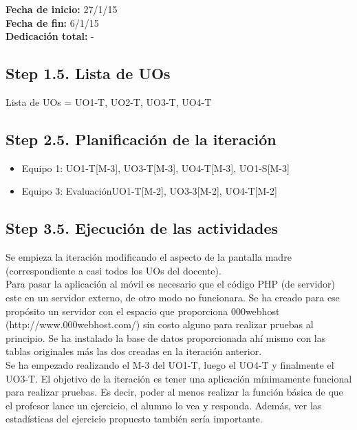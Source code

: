 \begin{flushleft}
\textbf{Fecha de inicio:} 27/1/15\\
\textbf{Fecha de fin:} 6/1/15\\
\textbf{Dedicación total:} -\\
\end{flushleft}

\subsection{Step 1.5. Lista de UOs}
\label{it5:1.5}

Lista de UOs = {UO1-T, UO2-T, UO3-T, UO4-T}

\subsection{Step 2.5. Planificación de la iteración}
\label{it5:2.5}

\begin{itemize}
\item Equipo 1: UO1-T[M-3], UO3-T[M-3], UO4-T[M-3], UO1-S[M-3]
\item Equipo 3: Evaluación{UO1-T[M-2], UO3-3[M-2], UO4-T[M-2]}
\end{itemize}

\subsection{Step 3.5. Ejecución de las actividades}
\label{it5:3.5}

Se empieza la iteración modificando el aspecto de la pantalla madre (correspondiente a casi todos los UOs del docente).\\

Para pasar la aplicación al móvil es necesario que el código PHP (de servidor) este en un servidor externo, de otro modo no funcionara. Se ha creado para ese propósito un servidor con el espacio que proporciona 000webhost (http://www.000webhost.com/) sin costo alguno para realizar pruebas al principio. Se ha instalado la base de datos proporcionada ahí mismo con las tablas originales más las dos creadas en la iteración anterior.\\

Se ha empezado realizando el M-3 del UO1-T, luego el UO4-T y finalmente el UO3-T. El objetivo de la iteración es tener una aplicación mínimamente funcional para realizar pruebas. Es decir, poder al menos realizar la función básica de que el profesor lance un ejercicio, el alumno lo vea y responda. Además, ver las estadísticas del ejercicio propuesto también sería importante.\\

